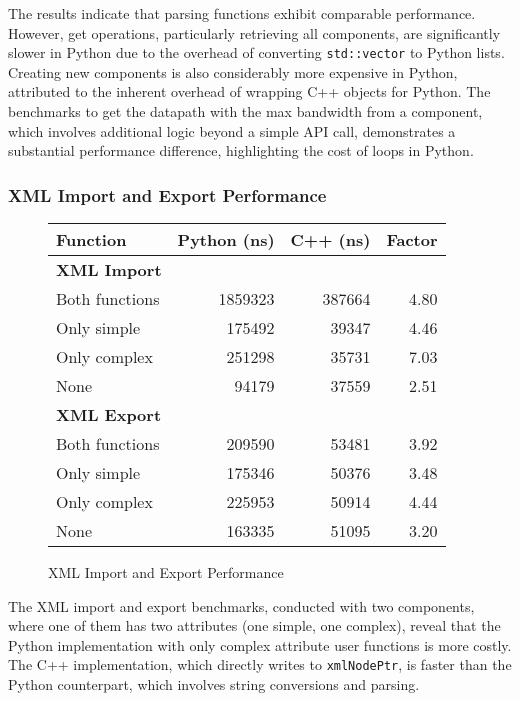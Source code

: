 The results indicate that parsing functions exhibit comparable performance. However, get operations, particularly retrieving all components, are significantly slower in Python due to the overhead of converting \texttt{std::vector} to Python lists. Creating new components is also considerably more expensive in Python, attributed to the inherent overhead of wrapping C++ objects for Python. The benchmarks to get the datapath with the max bandwidth from a component, which involves additional logic beyond a simple API call, demonstrates a substantial performance difference, highlighting the cost of loops in Python.

\subsubsection{XML Import and Export Performance}

\begin{figure}[htpb]
    \centering
\begin{tabular}{lrrr}
\textbf{Function} & \textbf{Python (ns)} & \textbf{C++ (ns)} & \textbf{Factor} \\
\hline
\textbf{XML Import} & & & \\
Both functions & 1859323 & 387664 & 4.80 \\
Only simple & 175492 & 39347 & 4.46 \\
Only complex & 251298 & 35731 & 7.03 \\
None & 94179 & 37559 & 2.51 \\
\textbf{XML Export} & & & \\
Both functions & 209590 & 53481 & 3.92 \\
Only simple & 175346 & 50376 & 3.48 \\
Only complex & 225953 & 50914 & 4.44 \\
None & 163335 & 51095 & 3.20 \\
\end{tabular}
\label{tab:XML import and export performance}
\caption{XML Import and Export Performance}
\end{figure}

The XML import and export benchmarks, conducted with two components, where one of them has two attributes (one simple, one complex), reveal that the Python implementation with only complex attribute user functions is more costly. The C++ implementation, which directly writes to \texttt{xmlNodePtr}, is faster than the Python counterpart, which involves string conversions and parsing.

